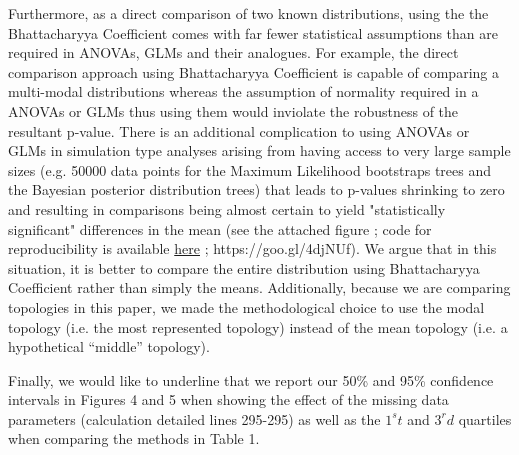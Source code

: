 \documentclass[11pt]{letter}
\begin{document}
\begin{letter}{}
Furthermore, as a direct comparison of two known distributions, using the the Bhattacharyya Coefficient comes with far fewer statistical assumptions than are required in ANOVAs, GLMs and their analogues. For example, the direct comparison approach using Bhattacharyya Coefficient is capable of comparing a multi-modal distributions whereas the assumption of normality required in a ANOVAs or GLMs thus using them would inviolate the robustness of the resultant p-value. There is an additional complication to using ANOVAs or GLMs in simulation type analyses arising from having access to very large sample sizes (e.g. 50000 data points for the Maximum Likelihood bootstraps trees and the Bayesian posterior distribution trees) that leads to p-values shrinking to zero and resulting in comparisons being almost certain to yield "statistically significant" differences in the mean (see the attached figure ; code for reproducibility is available \href{https://github.com/TGuillerme/Total_Evidence_Method-Missing_data/blob/master/Analysis/Comparing_distribution_example.R}{here} ; https://goo.gl/4djNUf). We argue that in this situation, it is better to compare the entire distribution using Bhattacharyya Coefficient rather than simply the means. Additionally, because we are comparing topologies in this paper, we made the methodological choice to use the modal topology (i.e. the most represented topology) instead of the mean topology (i.e. a hypothetical ``middle'' topology).

Finally, we would like to underline that we report our 50\% and 95\% confidence intervals in Figures 4 and 5 when showing the effect of the missing data parameters (calculation detailed lines 295-295) as well as the $1^st$ and $3^rd$ quartiles when comparing the methods in Table 1.


\end{letter}
\end{document}
